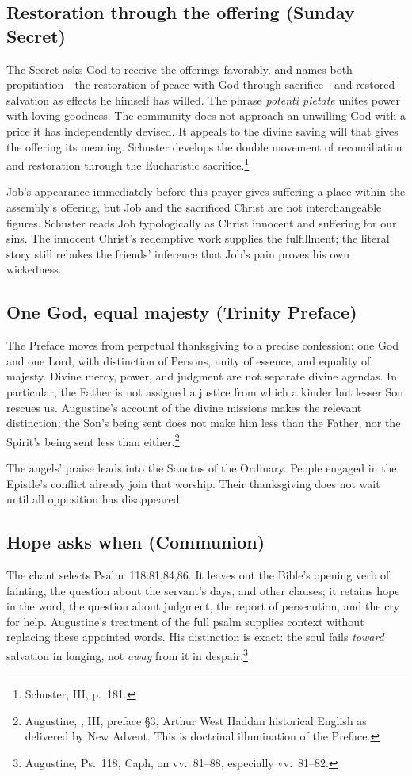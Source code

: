 \subsection{Restoration through the offering (Sunday Secret)}
The Secret asks God to receive the offerings favorably, and names both
propitiation---the restoration of peace with God through sacrifice---and
restored salvation as effects he himself has willed.
The phrase \textit{potenti pietate} unites power with loving goodness.
The community does not approach an unwilling God with a price it has
independently devised. It appeals to the divine saving will that gives
the offering its meaning. Schuster develops the double movement of
reconciliation and restoration through the Eucharistic sacrifice.\footnote{
Schuster,  III, p.~181.}

Job's appearance immediately before this prayer gives suffering a place
within the assembly's offering, but Job and the sacrificed Christ are
not interchangeable figures. Schuster reads Job typologically as Christ
innocent and suffering for our sins. The innocent Christ's redemptive
work supplies the fulfillment; the literal story still rebukes the
friends' inference that Job's pain proves his own wickedness.

\subsection{One God, equal majesty (Trinity Preface)}
The Preface moves from perpetual thanksgiving to a precise confession:
one God and one Lord, with distinction of Persons, unity of essence,
and equality of majesty. Divine mercy, power, and judgment are not
separate divine agendas. In particular, the Father is not assigned a
justice from which a kinder but lesser Son rescues us. Augustine's
account of the divine missions makes the relevant distinction: the Son's
being sent does not make him less than the Father, nor the Spirit's
being sent less than either.\footnote{Augustine, ,
III, preface \S3, Arthur West Haddan historical English as delivered by
New Advent. This is doctrinal illumination of the Preface.}

The angels' praise leads into the Sanctus of the Ordinary. People engaged
in the Epistle's conflict already join that worship. Their thanksgiving
does not wait until all opposition has disappeared.

\subsection{Hope asks when (Communion)}
The chant selects Psalm~118:81,84,86. It leaves out the Bible's opening
verb of fainting, the question about the servant's days, and other
clauses; it retains hope in the word, the question about judgment, the
report of persecution, and the cry for help. Augustine's treatment of
the full psalm supplies context without replacing these appointed
words. His distinction is exact: the soul fails \emph{toward} salvation
in longing, not \emph{away} from it in despair.\footnote{Augustine,
Ps.~118, Caph, on vv.~81--88, especially vv.~81--82.}

